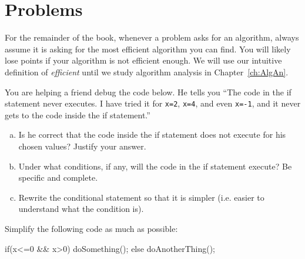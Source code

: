 \section{Problems}

\begin{rem}
For the remainder of the book, whenever a problem asks for an algorithm, 
always assume it is asking for the most efficient
algorithm you can find.  You will likely lose points if your algorithm is not efficient enough.
We will use our intuitive definition of {\em efficient} until
we study algorithm analysis in 
Chapter~\ref{ch:AlgAn}.
\end{rem}

\begin{pro}
You are helping a friend debug the code below.  
He tells you ``The code in the if statement never executes.  
I have tried it for \verb+x=2+, \verb+x=4+, and even \verb+x=-1+, 
and it never gets to the code inside the if statement.''
\begin{enumerate}[(a)]
\item
Is he correct that the code inside the if statement does not execute for his chosen values?  
Justify your answer.
\item
Under what conditions, if any, will the code in the if statement execute?  Be specific and complete.
\item
Rewrite the conditional statement so that it is simpler (i.e. easier to understand what the condition is).
\end{enumerate}
\end{pro}

\begin{pro}
Simplify the following code as much as possible:
\begin{code}
	if(x<=0 && x>0) {
	    doSomething();
	} else {
	    doAnotherThing();
	}
	
\end{code}
\end{pro}

